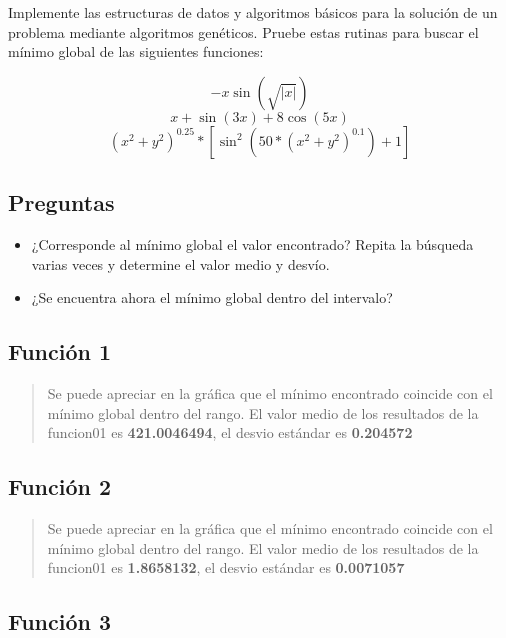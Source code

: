 \documentclass[]{book}
\begin{document}
Implemente las estructuras de datos y algoritmos básicos para la solución de un problema mediante algoritmos genéticos. Pruebe estas rutinas para buscar el mínimo global de las siguientes funciones:

\[-x \sin(\sqrt{|x|})\]
\[x+\sin(3x)+8\cos(5x)\]
\[(x^2+y^2)^{0.25}*[\sin^2(50*(x^2+y^2)^{0.1})+1]\]

\hypertarget{preguntas-3}{%
\subsection{Preguntas}\label{preguntas-3}}

\begin{itemize}
\item
  ¿Corresponde al mínimo global el valor encontrado? Repita la búsqueda varias veces y determine el valor medio y desvío.
\item
  ¿Se encuentra ahora el mínimo global dentro del intervalo?
\end{itemize}

\hypertarget{funcion-1}{%
\subsection{Función 1}\label{funcion-1}}

\begin{quote}
Se puede apreciar en la gráfica que el mínimo encontrado coincide con el mínimo global dentro del rango.
El valor medio de los resultados de la funcion01 es \textbf{421.0046494}, el desvio estándar es \textbf{0.204572}
\end{quote}

\hypertarget{funcion-2}{%
\subsection{Función 2}\label{funcion-2}}

\begin{quote}
Se puede apreciar en la gráfica que el mínimo encontrado coincide con el mínimo global dentro del rango.
El valor medio de los resultados de la funcion01 es \textbf{1.8658132}, el desvio estándar es \textbf{0.0071057}
\end{quote}

\hypertarget{funcion-3}{%
\subsection{Función 3}\label{funcion-3}}
\end{document}
